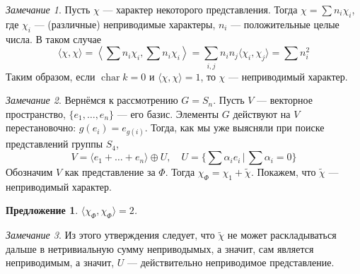 \documentclass{article}
\newtheorem*{proposition}{Предложение}
\theoremstyle{definition}
\theoremstyle{remark}
\newtheorem*{remark}{Замечание}
\DeclareMathOperator{\chr}{char}
\begin{document}
\begin{remark}
    Пусть $\chi$ --- характер некоторого представления. Тогда $\chi = \sum n_i \chi_i$, где $\chi_i$ --- (различные) неприводимые характеры, $n_i$ --- положительные целые числа. В таком случае
    \begin{equation*}
        \langle \chi, \chi \rangle = \left\langle \sum n_i \chi_i, \sum n_i \chi_i \right\rangle = \sum_{i, j} n_i n_j \langle \chi_i, \chi_j \rangle = \sum n_i^2
    \end{equation*}
    Таким образом, если $\chr k = 0$ и $\langle \chi, \chi \rangle = 1$, то $\chi$ --- неприводимый характер.
\end{remark}

\begin{remark}
    Вернёмся к рассмотрению $G = S_n$. Пусть $V$ --- векторное пространство, $\{e_1, \hdots, e_n\}$ --- его базис. Элементы $G$ действуют на $V$ перестановочно: $g(e_i) = e_{g(i)}$. Тогда, как мы уже выясняли при поиске представлений группы $S_4$,
    \begin{equation*}
        V = \langle e_1 + \hdots + e_n \rangle \oplus U, \quad U = \{ \sum \alpha_i e_i \,|\, \sum \alpha_i = 0 \}
    \end{equation*}
    Обозначим $V$ как представление за $\Phi$. Тогда $\chi_\Phi = \chi_1 + \tilde{\chi}$. Покажем, что $\tilde{\chi}$ --- неприводимый характер.
\end{remark}

\begin{proposition}
    $\langle \chi_\Phi, \chi_\Phi \rangle = 2$.
\end{proposition}

\begin{remark}
    Из этого утверждения следует, что $\tilde{\chi}$ не может раскладываться дальше в нетривиальную сумму неприводымых, а значит, сам является неприводимым, а значит, $U$ --- действительно неприводимое представление.
\end{remark}
\end{document}
